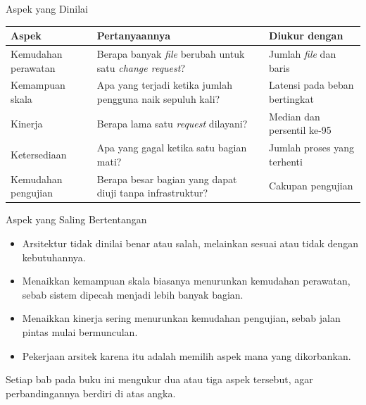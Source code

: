 \documentclass[aspectratio=169, table, 12pt]{beamer}
\begin{document}
\begin{frame}{{\Large Aspek yang Dinilai}}
  \vspace{4pt}
  \centering
  \footnotesize
  \begin{tabularx}{\textwidth}{|l|X|X|}
    \hline
    \textbf{Aspek} & \textbf{Pertanyaannya} & \textbf{Diukur dengan} \\
    \hline
    Kemudahan perawatan & Berapa banyak \textit{file} berubah untuk satu
      \textit{change request}? & Jumlah \textit{file} dan baris \\
    \hline
    Kemampuan skala & Apa yang terjadi ketika jumlah pengguna naik sepuluh
      kali? & Latensi pada beban bertingkat \\
    \hline
    Kinerja & Berapa lama satu \textit{request} dilayani? & Median dan
      persentil ke-95 \\
    \hline
    Ketersediaan & Apa yang gagal ketika satu bagian mati? & Jumlah proses
      yang terhenti \\
    \hline
    Kemudahan pengujian & Berapa besar bagian yang dapat diuji tanpa
      infrastruktur? & Cakupan pengujian \\
    \hline
  \end{tabularx}
\end{frame}

\begin{frame}{{\Large Aspek yang Saling Bertentangan}}
  \vspace{8pt}
  \begin{itemize}\small
    \item Arsitektur tidak dinilai benar atau salah, melainkan sesuai atau
          tidak dengan kebutuhannya.
    \item Menaikkan kemampuan skala biasanya menurunkan kemudahan perawatan,
          sebab sistem dipecah menjadi lebih banyak bagian.
    \item Menaikkan kinerja sering menurunkan kemudahan pengujian, sebab jalan
          pintas mulai bermunculan.
    \item Pekerjaan arsitek karena itu adalah memilih aspek mana yang
          dikorbankan.
  \end{itemize}

  \vspace{8pt}
  {\small Setiap bab pada buku ini mengukur dua atau tiga aspek tersebut, agar
  perbandingannya berdiri di atas angka.}
\end{frame}
\end{document}
